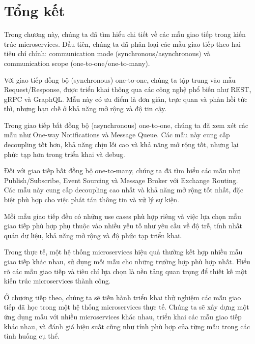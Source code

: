 \section{Tổng kết}
Trong chương này, chúng ta đã tìm hiểu chi tiết về các mẫu giao tiếp trong kiến trúc microservices. Đầu tiên, chúng ta đã phân loại các mẫu giao tiếp theo hai tiêu chí chính: communication mode (synchronous/asynchronous) và communication scope (one-to-one/one-to-many).

Với giao tiếp đồng bộ (synchronous) one-to-one, chúng ta tập trung vào mẫu Request/Response, được triển khai thông qua các công nghệ phổ biến như REST, gRPC và GraphQL. Mẫu này có ưu điểm là đơn giản, trực quan và phản hồi tức thì, nhưng hạn chế ở khả năng mở rộng và độ tin cậy.

Trong giao tiếp bất đồng bộ (asynchronous) one-to-one, chúng ta đã xem xét các mẫu như One-way Notifications và Message Queue. Các mẫu này cung cấp decoupling tốt hơn, khả năng chịu lỗi cao và khả năng mở rộng tốt, nhưng lại phức tạp hơn trong triển khai và debug.

Đối với giao tiếp bất đồng bộ one-to-many, chúng ta đã tìm hiểu các mẫu như Publish/Subscribe, Event Sourcing và Message Broker với Exchange Routing. Các mẫu này cung cấp decoupling cao nhất và khả năng mở rộng tốt nhất, đặc biệt phù hợp cho việc phát tán thông tin và xử lý sự kiện.

Mỗi mẫu giao tiếp đều có những use cases phù hợp riêng và việc lựa chọn mẫu giao tiếp phù hợp phụ thuộc vào nhiều yếu tố như yêu cầu về độ trễ, tính nhất quán dữ liệu, khả năng mở rộng và độ phức tạp triển khai.

Trong thực tế, một hệ thống microservices hiệu quả thường kết hợp nhiều mẫu giao tiếp khác nhau, sử dụng mỗi mẫu cho những trường hợp phù hợp nhất. Hiểu rõ các mẫu giao tiếp và tiêu chí lựa chọn là nền tảng quan trọng để thiết kế một kiến trúc microservices thành công.

Ở chương tiếp theo, chúng ta sẽ tiến hành triển khai thử nghiệm các mẫu giao tiếp đã học trong một hệ thống microservices thực tế. Chúng ta sẽ xây dựng một ứng dụng mẫu với nhiều microservices khác nhau, triển khai các mẫu giao tiếp khác nhau, và đánh giá hiệu suất cũng như tính phù hợp của từng mẫu trong các tình huống cụ thể.